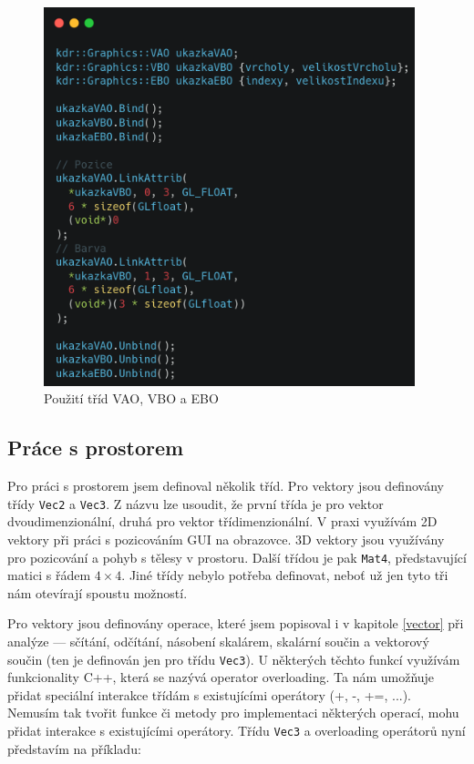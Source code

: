 \documentclass[12pt]{article}
\begin{document}
\vspace{0.5cm}
\begin{figure}[h]
    \centering
    \includegraphics[height=11cm]{images/vao_vbo_ebo_example.png}
    \caption{Použití tříd VAO, VBO a EBO}
    \label{fig:Použití tříd VAO, VBO a EBO}
\end{figure}

\pagebreak

\subsection{Práce s prostorem}

Pro práci s prostorem jsem definoval několik tříd. Pro vektory jsou definovány třídy \texttt{Vec2} a \texttt{Vec3}. Z názvu lze usoudit, že první třída je pro vektor dvoudimenzionální, druhá pro vektor třídimenzionální. V praxi využívám 2D vektory při práci s pozicováním GUI na obrazovce. 3D vektory jsou využívány pro pozicování a pohyb s tělesy v prostoru. Další třídou je pak \texttt{Mat4}, představující matici s řádem $4 \times 4$. Jiné třídy nebylo potřeba definovat, neboť už jen tyto tři nám otevírají spoustu možností.

Pro vektory jsou definovány operace, které jsem popisoval i v kapitole \ref{vector} při analýze — sčítání, odčítání, násobení skalárem, skalární součin a vektorový součin (ten je definován jen pro třídu \texttt{Vec3}). U některých těchto funkcí využívám funkcionality C++, která se nazývá operator overloading. Ta nám umožňuje přidat speciální interakce třídám s existujícími operátory (+, -, +=, ...). Nemusím tak tvořit funkce či metody pro implementaci některých operací, mohu přidat interakce s existujícími operátory. \cite{operator_overloading} Třídu \texttt{Vec3} a overloading operátorů nyní představím na příkladu:
\end{document}
